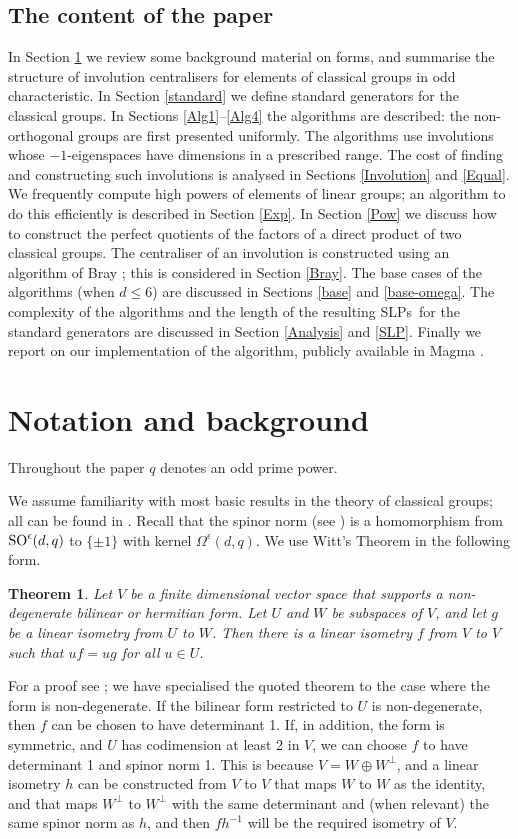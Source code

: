 \documentclass[12pt]{article}
\newtheorem{theorem}[definition]{Theorem}
\def\SO{{\rm SO}}
\def\SLPs{{\rm SLPs}}
\begin{document}
\subsection{The content of the paper} 
In Section \ref{cent} we review some background material
on forms, and summarise
the structure of involution centralisers
for elements of classical groups in odd characteristic.
In Section \ref{standard} we define
standard generators for the classical groups.
In Sections \ref{Alg1}--\ref{Alg4} 
the algorithms are described: the non-orthogonal groups 
are first presented uniformly. 
The algorithms use involutions whose $-1$-eigenspaces  have
dimensions in a prescribed range.  The cost 
of finding and constructing such involutions 
is analysed in Sections \ref{Involution} and \ref{Equal}.
We frequently compute high powers of elements of linear groups; 
an algorithm to do this
efficiently is described in Section \ref{Exp}. 
In Section \ref{Pow} we discuss how to  
construct the perfect quotients of the factors of a 
direct product of two classical groups. 
The centraliser of an involution is constructed using an 
algorithm of Bray \cite{Bray}; this is considered
in Section \ref{Bray}. The base cases of the
algorithms (when $d \leq 6$) are discussed in Sections \ref{base}
and \ref{base-omega}. 
The complexity of the algorithms and the 
length of the resulting \SLPs\ for the standard generators
are discussed in Section \ref{Analysis} and \ref{SLP}.  
Finally we report on our implementation of the algorithm, 
publicly available in {\sc Magma} \cite{Magma}.

\section{Notation and background}\label{cent} 
Throughout the paper $q$ denotes an odd prime power.

We assume familiarity with most basic results in the theory of
classical groups; all can be found in \cite{Taylor}.  
Recall that the spinor norm (see \cite[p.\ 163]{Taylor})
is a homomorphism from
$\SO^\epsilon(d,q)$ to $\{\pm1\}$ with kernel $\Omega^\epsilon(d,q)$. 
We use Witt's Theorem in the following form. 
\begin{theorem}  \label{Witt}
Let $V$ be a  finite  dimensional  vector  space that  supports  a
non-degenerate bilinear or hermitian form.  
Let $U$  and $W$ be subspaces of $V$,
and let $g$ be  a linear isometry from $U$  to $W$.  Then there is a
linear isometry $f$ from $V$ to $V$ such that  $uf=ug$ for all $u\in U$.
\end{theorem}
For  a proof see \cite[Theorem 7.4]{Taylor}; we have specialised the
quoted theorem
to the case where the form is non-degenerate. 
If the bilinear form restricted to $U$ is non-degenerate, then 
$f$ can be chosen to have determinant 1. 
If, in addition, the form is symmetric, and 
$U$ has codimension at least 2 in $V$, we 
can choose $f$ to have determinant 1 and
spinor norm 1. This is because $V=W\oplus  W^\perp$,  and a  linear
isometry $h$ can be constructed from $V$ to  $V$ that maps $W$ to $W$
as the identity, and that maps  $W^\perp$ to $W^\perp$ with the  same
determinant and (when relevant) the same  spinor norm as $h$, and then
$fh^{-1}$ will be the required isometry of $V$.
\end{document}
